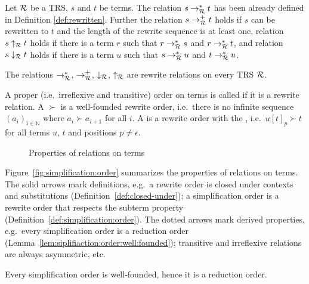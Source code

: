 \begin{definition}
	Let \( \mathcal{R} \) be a TRS, \( s \) and \( t \) be terms.
	The relation \( s \rightarrow^*_{\mathcal{R}} t \) has been already defined in Definition
	\vref{def:rewritten}.
	Further	the relation \( s \rightarrow^+_{\mathcal{R}} t \) holds
	if \( s \) can be rewritten to \( t \)
	and the length of the rewrite sequence is at least one,
	relation \( s \uparrow_{\mathcal{R}} t \) holds if there is a term \( r \) such that
	\( r \rightarrow^*_{\mathcal{R}} s \) and \( r \rightarrow^*_{\mathcal{R}} t \), and
	relation \( s \downarrow_{\mathcal{R}} t\) holds if there is a term \( u \) such that
	\( s \rightarrow^*_{\mathcal{R}} u \) and \( t \rightarrow^*_{\mathcal{R}} u \).
\end{definition}
\begin{lemma}
	The relations \( \rightarrow^*_{\mathcal{R}} \),
	\( \rightarrow^+_{\mathcal{R}} \),
	\( \downarrow_{\mathcal{R}} \), \( \uparrow_{\mathcal{R}} \) are rewrite relations on every TRS \( \mathcal{R} \).
\end{lemma}
\begin{definition}\label{def:simplification:order}
	A proper (i.e.~irreflexive and transitive) order on terms is called  if it is a rewrite relation.
	A  \( \succ \) is a well-founded rewrite order,
	i.e.~there is no infinite sequence
	\( {(a_i)}_{i\in\mathbb{N}} \)
	where \( a_i\succ a_{i+1} \) for all \( i \).
	A  is a rewrite order with the ,
	i.e.~\( u{[t]}_p \succ t \) for all terms \( u \), \( t \) and positions \( p\neq\epsilon \).
\end{definition}

\begin{figure}[htb]\label{fig:simplification:order}
	
	\caption{Properties of relations on terms}
\end{figure}

Figure~\vref{fig:simplification:order} summarizes the properties of relations on terms.
The solid arrows mark definitions,
e.g.~a rewrite order is closed under contexts and substitutions (Definition~\ref{def:closed-under});
a simplification order is a rewrite order
that respects the subterm property
(Definition~\ref{def:simplification:order}).
The dotted arrows mark derived properties,
e.g.~every simplification order is a reduction order
(Lemma~\ref{lem:siplifiaction:order:well:founded});
transitive and irreflexive relations are always asymmetric,
etc.

\begin{lemma}\label{lem:siplifiaction:order:well:founded}
	Every simplification order is well-founded, hence it is a reduction order.
\end{lemma}

